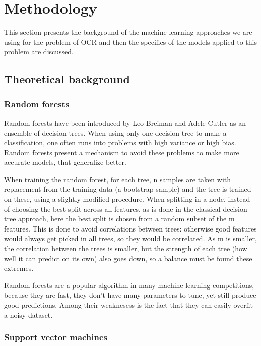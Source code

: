 \section{Methodology}
\label{sec:method}
This section presents the background of the machine learning approaches we are using for the problem of OCR and then the specifics of the models applied to this problem are discussed. 

\subsection{Theoretical background}

\subsubsection{Random forests}

Random forests have been introduced by Leo Breiman and Adele Cutler\cite{breiman2001random} as an ensemble of decision trees. When using only one decision tree to make a classification, one often runs into problems with high variance or high bias. Random forests present a mechanism to avoid these problems to make more accurate models, that generalize better. 

When training the random forest, for each tree, n samples are taken with replacement from the training data (a bootstrap sample) and the tree is trained on these, using a slightly modified procedure. When splitting in a node, instead of choosing the best split across all features, as is done in the classical decision tree approach, here the best split is chosen from a random subset of the m features. This is done to avoid correlations between trees: otherwise good features would always get picked in all trees, so they would be correlated. As m is smaller, the correlation between the trees is smaller, but the strength of each tree (how well it can predict on its own) also goes down, so a balance must be found these extremes. 

Random forests are a popular algorithm in many machine learning competitions, because they are fast, they don't have many parameters to tune, yet still produce good predictions. Among their weaknesess is the fact that they can easily overfit a noisy dataset. 

\subsubsection{Support vector machines}

